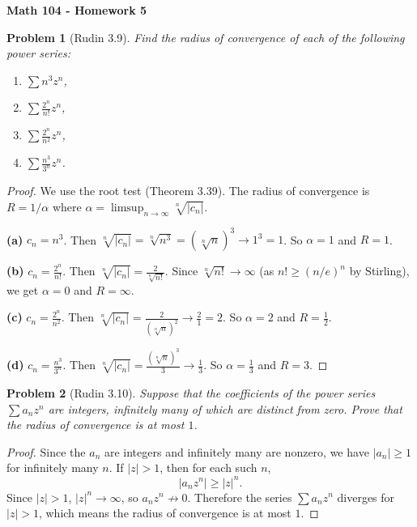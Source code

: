 \documentclass[12 pt]{article}        	%
\newtheorem{prob}{Problem}
\begin{document}
\begin{center}
    \textbf{\Large Math 104 - Homework 5}\\
\end{center}

\begin{prob}[Rudin 3.9]
Find the radius of convergence of each of the following power series:
\begin{enumerate}
    \item[(a)] $\sum n^3 z^n$,
    \item[(b)] $\displaystyle\sum \frac{2^n}{n!} z^n$,
    \item[(c)] $\displaystyle\sum \frac{2^n}{n^2} z^n$,
    \item[(d)] $\displaystyle\sum \frac{n^3}{3^n} z^n$.
\end{enumerate}
\end{prob}
\begin{proof}
We use the root test (Theorem 3.39). The radius of convergence is $R = 1/\alpha$ where $\alpha = \limsup_{n \to \infty} \sqrt[n]{|c_n|}$.

\textbf{(a)} $c_n = n^3$. Then $\sqrt[n]{|c_n|} = \sqrt[n]{n^3} = (\sqrt[n]{n})^3 \to 1^3 = 1$. So $\alpha = 1$ and $R = 1$.

\textbf{(b)} $c_n = \frac{2^n}{n!}$. Then $\sqrt[n]{|c_n|} = \frac{2}{\sqrt[n]{n!}}$. Since $\sqrt[n]{n!} \to \infty$ (as $n! \geq (n/e)^n$ by Stirling), we get $\alpha = 0$ and $R = \infty$.

\textbf{(c)} $c_n = \frac{2^n}{n^2}$. Then $\sqrt[n]{|c_n|} = \frac{2}{(\sqrt[n]{n})^2} \to \frac{2}{1} = 2$. So $\alpha = 2$ and $R = \frac{1}{2}$.

\textbf{(d)} $c_n = \frac{n^3}{3^n}$. Then $\sqrt[n]{|c_n|} = \frac{(\sqrt[n]{n})^3}{3} \to \frac{1}{3}$. So $\alpha = \frac{1}{3}$ and $R = 3$.
\end{proof}

\begin{prob}[Rudin 3.10]
Suppose that the coefficients of the power series $\sum a_n z^n$ are integers, infinitely many of which are distinct from zero. Prove that the radius of convergence is at most $1$.
\end{prob}
\begin{proof}
Since the $a_n$ are integers and infinitely many are nonzero, we have $|a_n| \geq 1$ for infinitely many $n$. If $|z| > 1$, then for each such $n$,
\[
|a_n z^n| \geq |z|^n.
\]
Since $|z| > 1$, $|z|^n \to \infty$, so $a_n z^n \not\to 0$. Therefore the series $\sum a_n z^n$ diverges for $|z| > 1$, which means the radius of convergence is at most $1$.
\end{proof}
\end{document}
